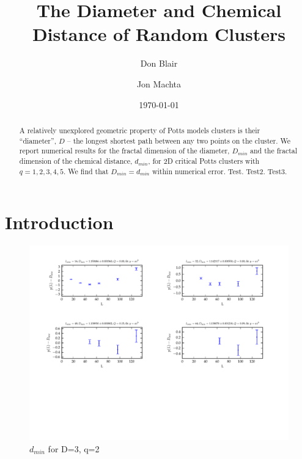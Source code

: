 \documentclass[pre,preprint]{revtex4}
\begin{document}
\title{The Diameter and Chemical Distance of Random Clusters}

\author{Don Blair}
\author{Jon Machta}

\date{\today}


\begin{abstract}
 A relatively unexplored geometric property of Potts models clusters is their ``diameter'', $D$ -- the longest shortest path between any two points on the cluster. We report numerical results for the fractal dimension of the diameter, $D_{min}$ and the fractal dimension of the chemical distance, $d_{min}$, for 2D critical Potts clusters with $q=1,2,3,4,5$. We find that $D_{min} = d_{min}$ within numerical error. Test. Test2. Test3.
\end{abstract}

\maketitle 

\section{Introduction}



\begin{figure}[htp]
\centering
\includegraphics[width=1.1\textwidth]{figures/d_min_D2q1_42_fig}
\caption{$d_{min}$ for D=3, q=2}\label{fig:erptsqfit}
\end{figure}
\end{document}
